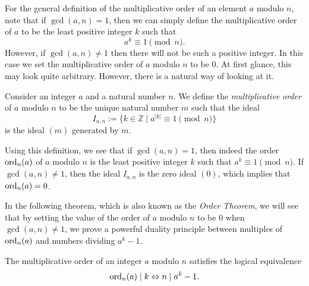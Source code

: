 
For the general definition of the multiplicative order of an element $a$ modulo $n$, note that if $\gcd(a,n)=1$, then we can simply define the multiplicative order of $a$ to be the least positive integer $k$ such that
\begin{equation*}
  a^k\equiv 1\pmod{n}.
\end{equation*}
However, if $\gcd(a,n)\neq 1$ then there will not be such a positive integer. In this case we set the multiplicative order of $a$ modulo $n$ to be $0$. At first glance, this may look quite arbitrary. However, there is a natural way of looking at it.

\begin{definition}
  Consider an integer $a$ and a natural number $n$. We define the \emph{multiplicative order} of $a$ modulo $n$ to be the unique natural number $m$ such that the ideal
  \begin{equation*}
    I_{a,n}:=\{k\in\mathbb{Z}\mid a^{|k|} \equiv 1\pmod{n}\}
  \end{equation*}
  is the ideal $(m)$ generated by $m$.
\end{definition}

Using this definition, we see that if $\gcd(a,n)=1$, then indeed the order $\operatorname{ord}_n(a)$ of $a$ modulo $n$ is the least positive integer $k$ such that $a^k\equiv 1\pmod{n}$. If $\gcd(a,n)\neq 1$, then the ideal $I_{a,n}$ is the zero ideal $(0)$, which implies that $\operatorname{ord}_n(a)=0$.

In the following theorem, which is also known as the \emph{Order Theorem}, we will see that by setting the value of the order of $a$ modulo $n$ to be $0$ when $\gcd(a,n)\neq 1$, we prove a powerful duality principle between multiples of $\operatorname{ord}_n(a)$ and numbers dividing $a^k-1$.

\begin{theorem}\label{theorem:order-theorem}
  The multiplicative order of an integer $a$ modulo $n$ satisfies the logical equivalence
  \begin{equation*}
    \operatorname{ord}_n(a)\mid k \Leftrightarrow n \mid a^k-1.
  \end{equation*}
\end{theorem}

